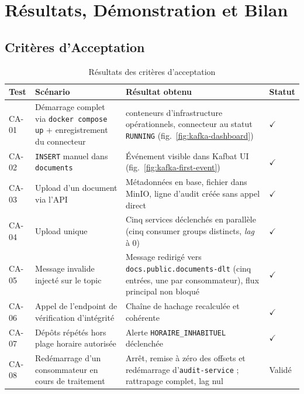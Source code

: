 \documentclass[12pt,a4paper,openany]{report}
\begin{document}
    \chapter{R\'esultats, D\'emonstration et Bilan}
    \label{chap:resultats}

    \section{Crit\`eres d'Acceptation}

    \renewcommand{\arraystretch}{1.3}
    \begin{longtable}{p{1.1cm} >{\raggedright\arraybackslash}p{5.3cm} >{\raggedright\arraybackslash}p{5.0cm} >{\raggedright\arraybackslash}p{1.6cm}}
      \caption{R\'esultats des crit\`eres d'acceptation}\label{tab:criteres-acceptation}\\
      \toprule
      \textbf{Test} & \textbf{Sc\'enario} & \textbf{R\'esultat obtenu} & \textbf{Statut} \\
      \midrule
      \endhead
      \bottomrule
      \endfoot
      CA-01 & D\'emarrage complet via \texttt{docker compose up} + enregistrement du connecteur & 6 conteneurs d'infrastructure op\'erationnels, connecteur au statut \texttt{RUNNING} (fig.~\ref{fig:kafka-dashboard}) & $\checkmark$ \\[4pt]
      CA-02 & \texttt{INSERT} manuel dans \texttt{documents} & \'Ev\'enement visible dans Kafbat UI (fig.~\ref{fig:kafka-first-event}) & $\checkmark$ \\[4pt]
      CA-03 & Upload d'un document via l'API & M\'etadonn\'ees en base, fichier dans MinIO, ligne d'audit cr\'e\'ee sans appel direct & $\checkmark$ \\[4pt]
      CA-04 & Upload unique & Cinq services d\'eclench\'es en parall\`ele (cinq consumer groups distincts, \emph{lag} \`a 0) & $\checkmark$ \\[4pt]
      CA-05 & Message invalide inject\'e sur le topic & Message redirig\'e vers \texttt{docs.public.documents-dlt} (cinq entr\'ees, une par consommateur), flux principal non bloqu\'e & $\checkmark$ \\[4pt]
      CA-06 & Appel de l'endpoint de v\'erification d'int\'egrit\'e & Cha\^ine de hachage recalcul\'ee et coh\'erente & $\checkmark$ \\[4pt]
      CA-07 & D\'ep\^ots r\'ep\'et\'es hors plage horaire autoris\'ee & Alerte \texttt{HORAIRE\_INHABITUEL} d\'eclench\'ee & $\checkmark$ \\[4pt]
      CA-08 & Red\'emarrage d'un consommateur en cours de traitement & Arr\^et, remise \`a z\'ero des offsets et red\'emarrage d'\texttt{audit-service} ; rattrapage complet, lag nul & Valid\'e \\
    \end{longtable}
    \renewcommand{\arraystretch}{1}
\end{document}
